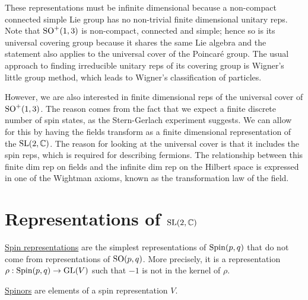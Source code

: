 These representations must be infinite dimensional because a non-compact 
connected simple Lie group has no non-trivial
finite dimensional unitary reps. %
Note that $\operatorname{SO}^+(1,3)$ is non-compact, connected and simple; hence so is its universal
covering group because it shares the same Lie algebra and the statement
also applies to the universal cover of the Poincar\'e group. 
The usual approach to finding irreducible unitary reps of its covering
group is Wigner's little group method, which leads to Wigner's classification of
particles.\cite{wigner_classification} 

However, we are also interested in finite dimensional reps of the universal
cover of $\operatorname{SO}^+(1,3)$. The reason comes from the fact that we expect a 
finite discrete number of spin states, as the
Stern-Gerlach experiment suggests. We can allow for this by having the fields 
transform as a finite dimensional representation of the $\operatorname{SL}(2,\mathbb{C})$.
The reason for looking at the universal cover is that it includes the spin reps,
which is required for describing fermions.
The relationship between this finite dim rep on fields and the infinite dim rep
on the Hilbert space is expressed in one of the Wightman axioms, known as the
transformation law of the field. 
\begin{comment}
	In this formalism, the fields are operator-valued, acting upon some
	Hilbert space $H$. 
	This axiom states that there is a projective representation
	$U:\mathbb{R}^{1,3}\rtimes\SO(1,3) \to \operatorname{PU}(H)$, and a
	spin representation $\sigma : \SL(2,\mathbb{C}) \to V$ such that 
	\[
	U(L,a)^{\dagger} \phi(x) U(L,a) = \sigma(L)\phi(L^{-1}(x-a))
	\] 
	where on the r.h.s, $\sigma(L)$ is a finite dimensional matrix acting upon
	the vector $(\phi^1, \ldots,\phi^{\dim V})$, and on the l.h.s
	the operator acts on each component of $\phi$. 
	So the finite dim rep gives the "classical field", while the infinite dim
	unitary rep tells us about the particle by Wigner's classification.
\end{comment}

\section{Representations of \texorpdfstring{$\operatorname{SL}(2,\mathbb{C})$}{SL(2,C)}}
\begin{defn}
	\underline{Spin representations} are the simplest representations of 
	$\operatorname{Spin}(p,q)$ that do not come from representations of  $\operatorname{SO}(p,q)$. 
	More precisely, it is a representation $\rho : \operatorname{Spin}(p,q) \to \operatorname{GL}(V)$ such 
	that $-1$ is not in the kernel of $\rho$.

	\underline{Spinors} are elements of a spin representation $V$.
\end{defn}




